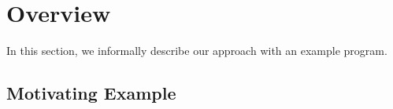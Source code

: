 \section{Overview} \label{Se:Overview}

In this section, we informally describe our approach with an example program.

\subsection{Motivating Example}


